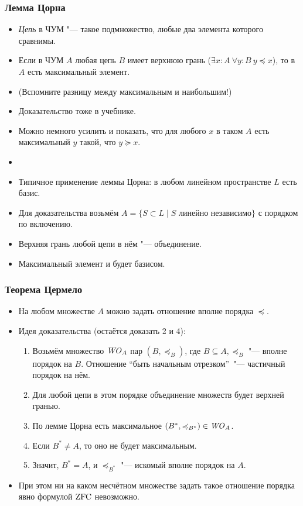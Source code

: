 \documentclass[10pt]{beamer}
\begin{document}
\begin{frame}
    \frametitle{Лемма Цорна}
    \begin{itemize}
        \item \emph{Цепь} в ЧУМ "--- такое подмножество, любые два элемента которого сравнимы.
        \item Если в ЧУМ $A$ любая цепь $B$ имеет верхнюю грань ($\exists x : A ~ \forall y : B ~ y \preccurlyeq x$), то в $A$ есть максимальный элемент.
        \item (Вспомните разницу между максимальным и наибольшим!)
        \item Доказательство тоже в учебнике.
        \pause
        \item Можно немного усилить и показать, что для любого $x$ в таком $A$ есть максимальный $y$ такой, что $y \succcurlyeq x$.
        \pause
        \item[]
        \item Типичное применение леммы Цорна: в любом линейном пространстве $L$ есть базис.
        \pause
        \item Для доказательства возьмём $A = \{S \subset L \mid S$ линейно независимо$\}$ с порядком по включению.
        \item Верхняя грань любой цепи в нём "--- объединение.
        \item Максимальный элемент и будет базисом.
    \end{itemize}
\end{frame}

\begin{frame}
    \frametitle{Теорема Цермело}
    \begin{itemize}
        \item На любом множестве $A$ можно задать отношение вполне порядка $\preccurlyeq$.
        \item Идея доказательства (остаётся доказать 2 и 4):
        \begin{enumerate}
            \item Возьмём множество $\mathit{WO}_A$ пар $(B, \preccurlyeq_B)$, где $B \subseteq A, \preccurlyeq_B$ "--- вполне порядок на $B$. Отношение \enquote{быть начальным отрезком}~"--- частичный порядок на нём.
            \item Для любой цепи в этом порядке объединение множеств будет верхней гранью.
            \item По лемме Цорна есть максимальное $(B^*, \preccurlyeq_{B^*}) \in \mathit{WO}_A$.
            \item Если $B^* \neq A$, то оно не будет максимальным.
            \item Значит, $B^* = A$, и $\preccurlyeq_{B^*}$ "--- искомый вполне порядок на $A$.
        \end{enumerate}
        \item При этом ни на каком несчётном множестве задать такое отношение порядка явно формулой $\mathrm{ZFC}$ невозможно.
    \end{itemize}
\end{frame}
\end{document}
